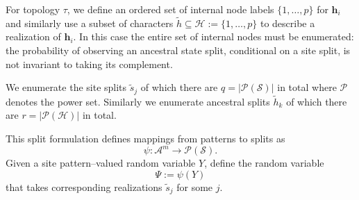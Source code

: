 \documentclass{article}
\newcommand{\alphabet}{\mathcal{A}}
\newcommand{\alignmentColumnRV}{Y}
\newcommand{\siteSplit}{\tilde{s}}
\newcommand{\siteSplitSet}{\mathcal{S}}
\newcommand{\ancestralStateColumn}{\mathbf{h}}
\newcommand{\ancestralSplit}{\tilde{h}}
\newcommand{\ancestralSplitSet}{\mathcal{H}}
\newcommand{\patternToSplit}{\psi}
\newcommand{\siteSplitRV}{\Psi}
\newcommand{\nSiteRows}{m}
\newcommand{\nAncestralStateRows}{p}
\newcommand{\nSiteSplits}{q}
\newcommand{\nAncestralSplits}{r}
\begin{document}
For topology $\tau$, we define an ordered set of internal node labels $\{1,\ldots,\nAncestralStateRows\}$ for $\ancestralStateColumn_i$ and similarly use a subset of characters $\ancestralSplit\subseteq\ancestralSplitSet:=\{1,\ldots,\nAncestralStateRows\}$ to describe a realization of $\ancestralStateColumn_i$.
In this case the entire set of internal nodes must be enumerated: the probability of observing an ancestral state split, conditional on a site split, is not invariant to taking its complement.

We enumerate the site splits $\siteSplit_j$ of which there are $\nSiteSplits=|\mathcal{P}(\siteSplitSet)|$ in total where $\mathcal{P}$ denotes the power set.
Similarly we enumerate ancestral splits $\ancestralSplit_k$ of which there are $\nAncestralSplits=|\mathcal{P}(\ancestralSplitSet)|$ in total.

This split formulation defines mappings from patterns to splits as
 $$
 \patternToSplit:\alphabet^\nSiteRows\rightarrow\mathcal{P}(\siteSplitSet).
 $$
Given a site pattern--valued random variable $\alignmentColumnRV$, define the random variable
$$
\siteSplitRV := \patternToSplit(\alignmentColumnRV)
$$
that takes corresponding realizations $\siteSplit_j$ for some $j$.
\end{document}
